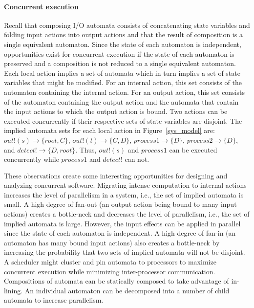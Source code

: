 \paragraph*{Concurrent execution}
Recall that composing I/O automata consists of concatenating state variables and folding input actions into output actions and that the result of composition is a single equivalent automaton.
Since the state of each automaton is independent, opportunities exist for concurrent execution if the state of each automaton is preserved and a composition is not reduced to a single equivalent automaton.
Each local action implies a set of automata which in turn implies a set of state variables that might be modified.
For an internal action, this set consists of the automaton containing the internal action.
For an output action, this set consists of the automaton containing the output action and the automata that contain the input actions to which the output action is bound.
Two actions can be executed concurrently if their respective sets of state variables are disjoint.
The implied automata sets for each local action in Figure~\ref{sys_model} are: $out!(s) \to \{root, C\}$, $out!(t) \to \{C, D\}$, $process1 \to \{D\}$, $process2 \to \{D\}$, and $detect! \to \{D, root\}$.
Thus, $out!(s)$ and $process1$ can be executed concurrently while $process1$ and $detect!$ can not.

\ifjournal
These observations create some interesting opportunities for designing and analyzing concurrent software.
Migrating intense computation to internal actions increases the level of parallelism in a system, i.e., the set of implied automata is small.
A high degree of fan-out (an output action being bound to many input actions) creates a bottle-neck and decreases the level of parallelism, i.e., the set of implied automata is large.
However, the input effects can be applied in parallel since the state of each automaton is independent.
A high degree of fan-in (an automaton has many bound input actions) also creates a bottle-neck by increasing the probability that two sets of implied automata will not be disjoint.
A scheduler might cluster and pin automata to processors to maximize concurrent execution while minimizing inter-processor communication.
Compositions of automata can be statically composed to take advantage of in-lining.
An individual automaton can be decomposed into a number of child automata to increase parallelism.

